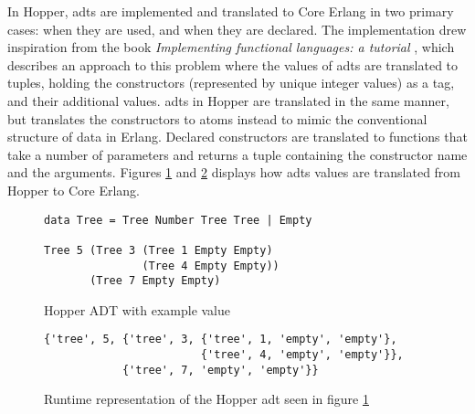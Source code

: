 In Hopper, \glspl{adt} are implemented and translated to Core Erlang in two primary cases: when they are used, and when they are declared. The implementation drew inspiration from the book \textit{Implementing functional languages: a tutorial} \cite{FunTutorial}, which describes an approach to this problem where the values of \glspl{adt} are translated to tuples, holding the constructors (represented by unique integer values) as a tag, and their additional values. \Glspl{adt} in Hopper are translated in the same manner, but translates the constructors to atoms instead to mimic the conventional structure of data in Erlang. Declared constructors are translated to functions that take a number of parameters and returns a tuple containing the constructor name and the arguments. Figures \ref{lst:hopperAdt} and \ref{lst:coreAdt} displays how \glspl{adt} values are translated from Hopper to Core Erlang.

\begin{figure}[!htb]
\centering
\begin{lstlisting} 
data Tree = Tree Number Tree Tree | Empty

Tree 5 (Tree 3 (Tree 1 Empty Empty) 
               (Tree 4 Empty Empty)) 
       (Tree 7 Empty Empty)
\end{lstlisting}
\caption{Hopper ADT with example value}
\label{lst:hopperAdt}
\end{figure}

\begin{figure}[!htb]
\centering
\begin{lstlisting} 
{'tree', 5, {'tree', 3, {'tree', 1, 'empty', 'empty'},
                        {'tree', 4, 'empty', 'empty'}},
            {'tree', 7, 'empty', 'empty'}}
\end{lstlisting}
\caption[Runtime representation of an \gls{adt} value]
 {Runtime representation of the Hopper \gls{adt} seen in figure \ref{lst:hopperAdt}}
\label{lst:coreAdt}
\end{figure}




